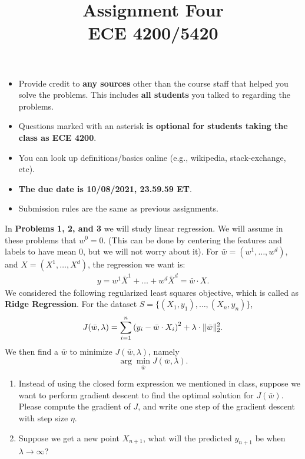 \documentclass[11pt]{article}
\title{Assignment Four\\ ECE 4200/5420}
\newenvironment{problem}[2][Problem]{\begin{trivlist}
\item[\hskip \labelsep {\bfseries #1}\hskip \labelsep {\bfseries #2.}]}{\end{trivlist}}
\begin{document}
\maketitle 

\begin{itemize}
\item
Provide credit to \textbf{any sources} other than the course staff that helped you solve the problems. This includes \textbf{all students} you talked to regarding the problems.\item
		Questions marked with an asterisk \textbf{is optional for students taking the class as ECE 4200}. 	
\item
You can look up definitions/basics online (e.g., wikipedia, stack-exchange, etc).
\item
{\bf The due date is 10/08/2021, 23.59.59 ET}. 
\item
Submission rules are the same as previous assignments.

\end{itemize}



\noindent In \textbf{Problems 1, 2, and 3} we will study linear regression. We will assume in these problems that $w^0=0$. (This can be done by centering the features and labels to have mean 0, but we will not worry about it).  For $\bar w = (w^1, \ldots, w^d)$, and $ X = ( X^1, \ldots,  X^d)$, the regression we want is:
\begin{align}
y = w^1 \bar X^1+\ldots + w^d \bar X^d = \bar w\cdot  X.
\end{align}
We considered the following regularized least squares objective, which is called as \textbf{Ridge Regression}. For the dataset $S=\{( X_1, y_1), \ldots, ( X_n, y_n)\}$,  
\begin{align}
J(\bar w, \lambda) = \sum_{i=1}^n {\left({y_i -\bar w\cdot X_i}\right)}^2 +\lambda \cdot \|\bar w\|_2^2.\label{eqn:ridge}
\end{align}
We then find a $\bar w$ to minimize $J(\bar w, \lambda)$, namely
\begin{equation}
\arg\min_{\bar w} J(\bar w, \lambda).
\label{eqn:optim}
\end{equation}
\begin{problem}{1 (10 points) Gradient Descent for regression}\quad

\begin{enumerate}
\item 
Instead of using the closed form expression we mentioned in class, suppose we want to perform gradient descent to find the optimal solution for $J(\bar w)$. Please compute the gradient of $J$, and write one step of the gradient descent with step size $\eta$. 
\item
Suppose we get a new point $ X_{n+1}$, what will the predicted $y_{n+1}$ be when $\lambda\to\infty$? 
\end{enumerate}
\end{problem}
\end{document}
